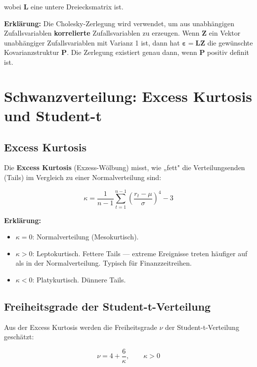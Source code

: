 \documentclass[12pt, a4paper]{article}
\begin{document}
wobei $\mathbf{L}$ eine untere Dreiecksmatrix ist.

\textbf{Erklärung:} Die Cholesky-Zerlegung wird verwendet, um aus unabhängigen
Zufallsvariablen \textbf{korrelierte} Zufallsvariablen zu erzeugen. Wenn
$\mathbf{Z}$ ein Vektor unabhängiger Zufallsvariablen mit Varianz 1 ist, dann
hat $\boldsymbol{\varepsilon} = \mathbf{L} \mathbf{Z}$ die gewünschte
Kovarianzstruktur $\mathbf{P}$. Die Zerlegung existiert genau dann, wenn
$\mathbf{P}$ positiv definit ist.

\section{Schwanzverteilung: Excess Kurtosis und Student-t}

\subsection{Excess Kurtosis}

Die \textbf{Excess Kurtosis} (Exzess-Wölbung) misst, wie „fett" die
Verteilungsenden (Tails) im Vergleich zu einer Normalverteilung sind:

\begin{equation}
    \kappa = \frac{1}{n-1} \sum_{t=1}^{n-1} \left(\frac{r_t - \mu}{\sigma}\right)^4 - 3
\end{equation}

\textbf{Erklärung:}
\begin{itemize}[leftmargin=1.5em]
    \item $\kappa = 0$: Normalverteilung (Mesokurtisch).
    \item $\kappa > 0$: Leptokurtisch. Fettere Tails — extreme Ereignisse treten
          häufiger auf als in der Normalverteilung. Typisch für Finanzzeitreihen.
    \item $\kappa < 0$: Platykurtisch. Dünnere Tails.
\end{itemize}

\subsection{Freiheitsgrade der Student-t-Verteilung}

Aus der Excess Kurtosis werden die Freiheitsgrade $\nu$ der Student-t-Verteilung
geschätzt:

\begin{equation}
    \nu = 4 + \frac{6}{\kappa}, \qquad \kappa > 0
\end{equation}
\end{document}
